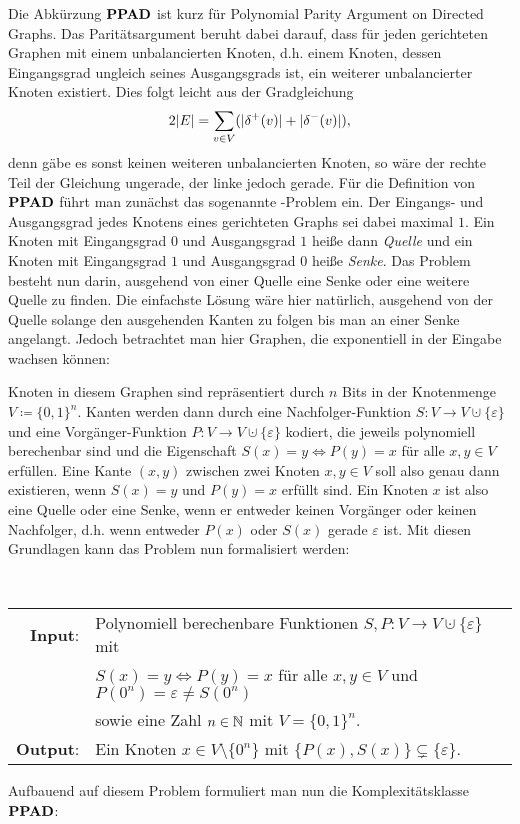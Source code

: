 Die Abkürzung $\textbf{PPAD}$ ist kurz für \glqq Polynomial Parity Argument on Directed Graphs\grqq.
Das Paritätsargument beruht dabei darauf, dass für jeden gerichteten Graphen mit einem unbalancierten Knoten, d.h. einem Knoten, dessen Eingangsgrad ungleich seines Ausgangsgrads ist, ein weiterer unbalancierter Knoten existiert.
Dies folgt leicht aus der Gradgleichung
\[
	2 \lvert E\rvert = \sum_{v\in V} ( \lvert\delta^+(v)\rvert + \lvert\delta^-(v)\rvert ),
\]
denn gäbe es sonst keinen weiteren unbalancierten Knoten, so wäre der rechte Teil der Gleichung ungerade, der linke jedoch gerade.
Für die Definition von~$\textbf{PPAD}$ führt man zunächst das sogenannte \EndOfTheLine-Problem ein.
Der Eingangs- und Ausgangsgrad jedes Knotens eines gerichteten Graphs sei dabei maximal $1$.
Ein Knoten mit Eingangsgrad $0$ und Ausgangsgrad $1$ heiße dann \emph{Quelle} und ein Knoten mit Eingangsgrad $1$ und Ausgangsgrad $0$ heiße \emph{Senke}.
Das Problem besteht nun darin, ausgehend von einer Quelle eine Senke oder eine weitere Quelle zu finden.
Die einfachste Lösung wäre hier natürlich, ausgehend von der Quelle solange den ausgehenden Kanten zu folgen bis man an einer Senke angelangt.
Jedoch betrachtet man hier Graphen, die exponentiell in der Eingabe wachsen können:

Knoten in diesem Graphen sind repräsentiert durch $n$ Bits in der Knotenmenge $V\coloneq \{ 0,1 \}^n$.
Kanten werden dann durch eine Nachfolger-Funktion $S: V\rightarrow V\cupdot \{ \varepsilon \}$ und eine Vorgänger-Funktion $P: V\rightarrow V \cupdot \{ \varepsilon \}$ kodiert, die jeweils polynomiell berechenbar sind und die Eigenschaft $S(x) = y \Leftrightarrow P(y) = x$ für alle $x,y \in V$ erfüllen.
Eine Kante $(x,y)$ zwischen zwei Knoten $x,y \in V$ soll also genau dann existieren, wenn $S(x) = y$ und $P(y) = x$ erfüllt sind.
Ein Knoten $x$ ist also eine Quelle oder eine Senke, wenn er entweder keinen Vorgänger oder keinen Nachfolger, d.h. wenn entweder $P(x)$ oder $S(x)$ gerade $\varepsilon$ ist.
Mit diesen Grundlagen kann das Problem nun formalisiert werden:
\begin{center}
	\begin{mdframed}
		\centering
		\emph{\EndOfTheLine} \\[1em]
		\begin{tabular}{rl}
			{\bfseries Input}: &Polynomiell berechenbare Funktionen $S,P: V\rightarrow V\cupdot \{ \varepsilon \}$ mit\\
			& $S(x) = y \Leftrightarrow P(y) = x$ für alle $x,y \in V$ und
			$P(0^n) = \varepsilon \neq S(0^n)$\\
			& sowie eine Zahl $n\in\mathbb{N}$ mit $V = \{ 0, 1 \}^n$.\\
			{\bfseries Output}: & Ein Knoten $x\in V\setminus \{ 0^n \}$ mit $\{ P(x), S(x) \} \subsetneq \{ \varepsilon \}$.
		\end{tabular}
	\end{mdframed}
\end{center}
Aufbauend auf diesem Problem formuliert man nun die Komplexitätsklasse~$\textbf{PPAD}$:


